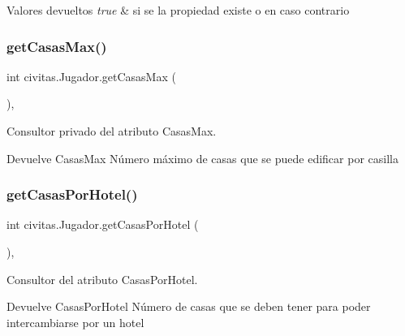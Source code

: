 \begin{DoxyRetVals}{Valores devueltos}
{\em true} & si se la propiedad existe o  en caso contrario \\
\hline
\end{DoxyRetVals}
\mbox{\label{classcivitas_1_1Jugador_a53bb212c80e5478ee456aac4e80c3aca}} 
\subsubsection{\texorpdfstring{get\+Casas\+Max()}{getCasasMax()}}
{\footnotesize\ttfamily int civitas.\+Jugador.\+get\+Casas\+Max (\begin{DoxyParamCaption}{ }\end{DoxyParamCaption})\hspace{0.3cm}{\ttfamily [inline]}, {\ttfamily [private]}}

Consultor privado del atributo Casas\+Max. \begin{DoxyReturn}{Devuelve}
Casas\+Max Número máximo de casas que se puede edificar por casilla 
\end{DoxyReturn}
\mbox{\label{classcivitas_1_1Jugador_a0fd044d8f7c6d61718b389124f93ec17}} 
\subsubsection{\texorpdfstring{get\+Casas\+Por\+Hotel()}{getCasasPorHotel()}}
{\footnotesize\ttfamily int civitas.\+Jugador.\+get\+Casas\+Por\+Hotel (\begin{DoxyParamCaption}{ }\end{DoxyParamCaption})\hspace{0.3cm}{\ttfamily [inline]}, {\ttfamily [package]}}

Consultor del atributo Casas\+Por\+Hotel. \begin{DoxyReturn}{Devuelve}
Casas\+Por\+Hotel Número de casas que se deben tener para poder intercambiarse por un hotel 
\end{DoxyReturn}
\mbox{\label{classcivitas_1_1Jugador_adcb057e3337f0c727184071a8b8374f8}} 
